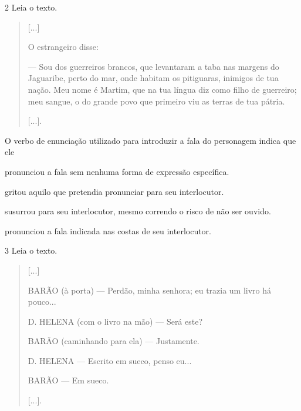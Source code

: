 \num{2} Leia o texto.

\begin{quote}
{[}...{]}

O estrangeiro disse:

--- Sou dos guerreiros brancos, que levantaram a taba nas margens do
Jaguaribe, perto do mar, onde habitam os pitiguaras, inimigos de tua
nação. Meu nome é Martim, que na tua língua diz como filho de guerreiro;
meu sangue, o do grande povo que primeiro viu as terras de tua pátria.

{[}...{]}.

\end{quote}

O verbo de enunciação utilizado para introduzir a fala do personagem indica que ele

\begin{escolha}
\item pronunciou a fala sem nenhuma forma de expressão específica.

\item gritou aquilo que pretendia pronunciar para seu interlocutor.

\item susurrou para seu interlocutor, mesmo correndo o risco de não ser ouvido.

\item pronunciou a fala indicada nas costas de seu interlocutor.
\end{escolha}


\num{3} Leia o texto.

\begin{quote}
{[}...{]}

BARÃO (à porta) --- Perdão, minha senhora; eu trazia um livro há
pouco...

D. HELENA (com o livro na mão) --- Será este?

BARÃO (caminhando para ela) --- Justamente.

D. HELENA --- Escrito em sueco, penso eu...

BARÃO --- Em sueco.

{[}...{]}.
\end{quote}

